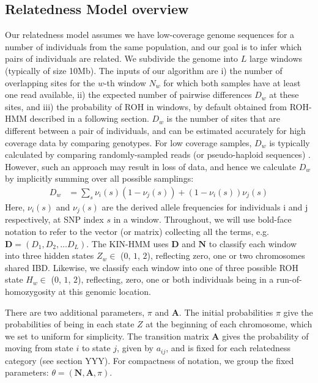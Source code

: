 \documentclass[12pt, letterpaper]{article}
\newcommand{\BD}{\mathbf{D}}
\newcommand{\BN}{\mathbf{N}}
\begin{document}
\subsection{Relatedness Model overview} 
Our relatedness model assumes we have low-coverage genome sequences for a number of individuals from the same population, and our goal is to infer which pairs of individuals are related. We subdivide the genome into $L$ large windows (typically of size 10Mb). The inputs of our algorithm are i) the number of overlapping sites for the $w$-th window $N_w$ for which both samples have at least one read available, ii) the expected number of pairwise differences $D_w$ at these sites, and iii) the probability of ROH in windows, by default obtained from ROH-HMM described in a following section. $D_w$ is the number of sites that are different between a pair of individuals, and can be estimated accurately for high coverage data by comparing genotypes. For low coverage samples, $D_w$ is typically calculated by comparing randomly-sampled reads (or pseudo-haploid sequences) \cite{haak_massive_2015}. However, such an approach may result in loss of data, and hence we calculate $D_w$ by implicitly summing over all possible samplings:
\begin{align}\label{eq:x}
D_w &= \sum_s \nu_i(s) (1-\nu_j(s)) + (1-\nu_i(s)) \nu_j(s)
\end{align}
Here, $\nu_i(s)$ and $\nu_j(s)$ are the derived allele frequencies for individuals i and j respectively, at SNP index $s$ in a window.
Throughout, we will use bold-face notation to refer to the vector (or matrix) collecting  all the terms, e.g. $\BD = (D_1, D_2, \dots D_L)$. The KIN-HMM uses $\BD$ and $\BN$  to classify each window into three hidden states $Z_w \in$ ($0$, $1$, $2$), reflecting zero, one or two chromosomes shared IBD. Likewise, we classify each window into one of three possible ROH state $H_w \in$ ($0$, $1$, $2$), reflecting, zero, one or both individuals being in a run-of-homozygosity at this genomic location.

There are two additional parameters, $\pi$ and $\mathbf{A}$. The initial probabilities $\pi$ give the probabilities of being in each state $Z$ at the beginning of each chromosome, which we set to uniform for simplicity. The transition matrix $\mathbf{A}$ gives the probability of moving from state $i$ to state $j$, given by $a_{ij}$, and is fixed for each relatedness category (see section YYY). For compactness of notation, we group the fixed parameters: $\theta = (\BN, \mathbf{A}, \pi)$. 
\end{document}
